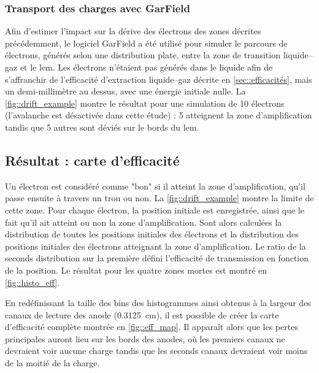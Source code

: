             \subsubsection{Transport des charges avec GarField}
                
                Afin d'estimer l'impact sur la dérive des électrons des zones décrites précédemment, le logiciel GarField \cite{garfield} a été utilisé pour simuler le parcours de  électrons, générés selon une distribution plate, entre la zone de transition liquide--gaz et le \gls{lem}. Les électrons n'étaient pas générés dans le liquide afin de s'affranchir de l'efficacité d'extraction liquide--gaz décrite en \autoref{sec::efficacités}, mais un demi-millimètre au dessus, avec une énergie initiale nulle. La \autoref{fig::drift_example} %
                montre le résultat pour une simulation de 10 électrons (l'avalanche est désactivée dans cette étude) : 5  atteignent la zone d'amplification tandis que 5 autres sont déviés sur le bords du \gls{lem}.
                
        \subsection{Résultat : carte d'efficacité}
            
            Un électron est considéré comme "bon" si il atteint la zone d'amplification, qu'il passe ensuite à travers un trou ou non. La \autoref{fig::drift_example} montre la limite de cette zone. Pour chaque électron, la position initiale est enregistrée, ainsi que le fait qu'il ait atteint ou non la zone d'amplification. Sont alors calculées la distribution de toutes les positions initiales des électrons et la distribution des positions initiales des électrons atteignant la zone d'amplification. Le ratio de la seconds distribution sur la première défini l'efficacité de transmission en fonction de la position. Le résultat pour les quatre zones mortes est montré en \autoref{fig::histo_eff}.
            
            En redéfinissant la taille des bins des histogrammes ainsi obtenus à la largeur des canaux de lecture des anode (\SI{0.3125}{\centi\meter}), il est possible de créer la carte d'efficacité complète montrée en \autoref{fig::eff_map}. Il apparaît alors que les pertes principales auront lieu sur les bords des anodes, où les premiers canaux ne devraient voir aucune charge tandis que les seconds canaux devraient voir moins de la moitié de la charge.
            
